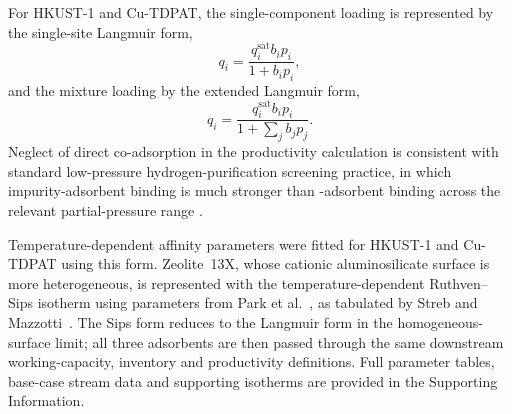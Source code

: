 \documentclass[11pt,a4paper]{article}
\newcommand{\Htwo}{\ce{H2}}
\begin{document}
For HKUST-1 and Cu-TDPAT, the single-component loading is represented by the
single-site Langmuir form,
\begin{equation}
q_i = \frac{q_i^{\mathrm{sat}} b_i p_i}{1+b_i p_i},
\label{eq:langmuir}
\end{equation}
and the mixture loading by the extended Langmuir form,
\begin{equation}
q_i = \frac{q_i^{\mathrm{sat}} b_i p_i}{1+\sum_j b_j p_j}.
\label{eq:extended}
\end{equation}
 Neglect of direct \Htwo{}
co-adsorption in the productivity calculation is consistent with standard
low-pressure hydrogen-purification screening practice, in which
impurity-adsorbent binding is much stronger than \Htwo-adsorbent binding
across the relevant partial-pressure range
\citep{Delgado2014PSAH2,Golmakani2017PSAVSATSA,Streb2020VPSAH2CO2}.

Temperature-dependent affinity parameters were fitted for HKUST-1 and
Cu-TDPAT using this form. Zeolite~13X, whose cationic aluminosilicate surface
is more heterogeneous, is represented with the temperature-dependent
Ruthven--Sips isotherm \citep{Ruthven1984PSA} using parameters from Park
et al.~\citep{Park2016Zeolite13X}, as tabulated by Streb and
Mazzotti~\citep{Streb2020VPSAH2CO2}. The Sips form reduces to the Langmuir
form in the homogeneous-surface limit; all three adsorbents are then passed
through the same downstream working-capacity, inventory and productivity
definitions. Full parameter tables, base-case stream data and supporting
isotherms are provided in the Supporting Information.
\end{document}
